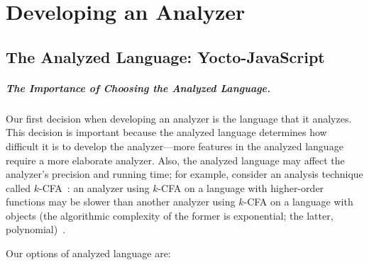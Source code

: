 \documentclass[12pt, oneside]{book}
\begin{document}
\chapter{Developing an Analyzer}


\section{The Analyzed Language: Yocto-JavaScript}

\paragraph{The Importance of Choosing the Analyzed Language.}

Our first decision when developing an analyzer is the language that it analyzes. This decision is important because the analyzed language determines how difficult it is to develop the analyzer—more features in the analyzed language require a more elaborate analyzer. Also, the analyzed language may affect the analyzer’s precision and running time; for example, consider an analysis technique called \(k\)-CFA~\cite{k-cfa}: an analyzer using \(k\)-CFA on a language with higher-order functions may be slower than another analyzer using \(k\)-CFA on a language with objects (the algorithmic complexity of the former is exponential; the latter, polynomial)~\cite{m-cfa}.

Our options of analyzed language are:
\end{document}
